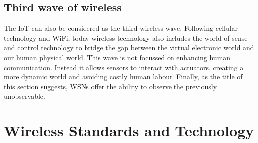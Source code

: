 \subsection{Third wave of wireless}
The IoT can also be considered as the third wireless wave. Following cellular technology and WiFi, today wireless technology also includes the world of sense and control technology to bridge the gap between the virtual electronic world and our human physical world. This wave is not focussed on enhancing human communication. Instead it allows sensors to interact with actuators, creating a more dynamic world and avoiding costly human labour. Finally, as the title of this section suggests, WSNs offer the ability to observe the previously unobservable.
\section{Wireless Standards and Technology}
